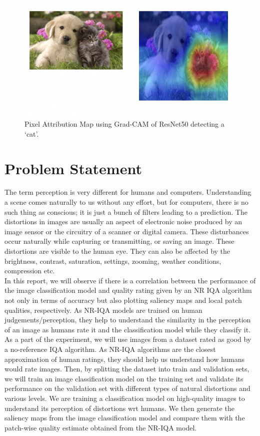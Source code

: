 \documentclass[10pt,twocolumn,letterpaper]{article}
\begin{document}
\begin{figure}[!ht]
	\centering
	\includegraphics[width=\columnwidth]{Images/Grad-CAM.png}
	\caption{Pixel Attribution Map using Grad-CAM of ResNet50 detecting a `cat'.}
\end{figure}


\section{Problem Statement}
\label{sec:problem}
The term perception is very different for humans and computers. Understanding a scene comes naturally to us without any effort, but for computers, there is no such thing as conscious; it is just a bunch of filters leading to a prediction. The distortions in images are usually an aspect of electronic noise produced by an image sensor or the circuitry of a scanner or digital camera. These disturbances occur naturally while capturing or transmitting, or saving an image. These distortions are visible to the human eye. They can also be affected by the brightness, contrast, saturation, settings, zooming, weather conditions, compression etc.\\

In this report, we will observe if there is a correlation between the performance of the image classification model and quality rating given by an NR IQA algorithm not only in terms of accuracy but also plotting saliency maps and local patch qualities, respectively. As NR-IQA models are trained on human judgements/perception, they help to understand the similarity in the perception of an image as humans rate it and the classification model while they classify it.\\

As a part of the experiment, we will use images from a dataset rated as good by a no-reference IQA algorithm. As NR-IQA algorithms are the closest approximation of human ratings, they should help us understand how humans would rate images. Then, by splitting the dataset into train and validation sets, we will train an image classification model on the training set and validate its performance on the validation set with different types of natural distortions and various levels. We are training a classification model on high-quality images to understand its perception of distortions wrt humans. We then generate the saliency maps from the image classification model and compare them with the patch-wise quality estimate obtained from the NR-IQA model.
\end{document}
